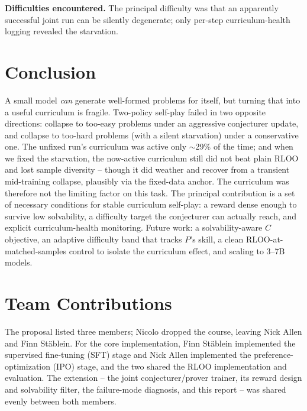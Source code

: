 \documentclass{article}
\begin{document}
\noindent\textbf{Difficulties encountered.} The principal difficulty was that an
apparently successful joint run can be silently degenerate; only per-step
curriculum-health logging revealed the starvation.

\section{Conclusion}
A small model \emph{can} generate well-formed problems for itself, but turning
that into a useful curriculum is fragile. Two-policy self-play failed in two
opposite directions: collapse to too-easy problems under an aggressive conjecturer
update, and collapse to too-hard problems (with a silent starvation) under a
conservative one. The unfixed run's curriculum was active only $\sim$29\% of the
time; and when we fixed the starvation, the now-active curriculum still did not
beat plain RLOO and lost sample diversity -- though it did weather and recover from
a transient mid-training collapse, plausibly via the fixed-data anchor. The
curriculum was therefore not the limiting factor on this task. The principal contribution is a set of necessary
conditions for stable curriculum self-play: a reward dense enough to survive low
solvability, a difficulty target the conjecturer can actually reach, and
explicit curriculum-health monitoring. Future work: a solvability-aware $C$
objective, an adaptive difficulty band that tracks $P$'s skill, a clean
RLOO-at-matched-samples control to isolate the curriculum effect, and scaling to
3--7B models.

\section{Team Contributions}
The proposal listed three members; Nicolo dropped the course, leaving Nick Allen
and Finn St\"ablein. For the core implementation, Finn St\"ablein implemented the
supervised fine-tuning (SFT) stage and Nick Allen implemented the
preference-optimization (IPO) stage, and the two shared the RLOO implementation
and evaluation. The extension -- the joint conjecturer/prover trainer, its reward
design and solvability filter, the failure-mode diagnosis, and this report -- was
shared evenly between both members.



\end{document}
